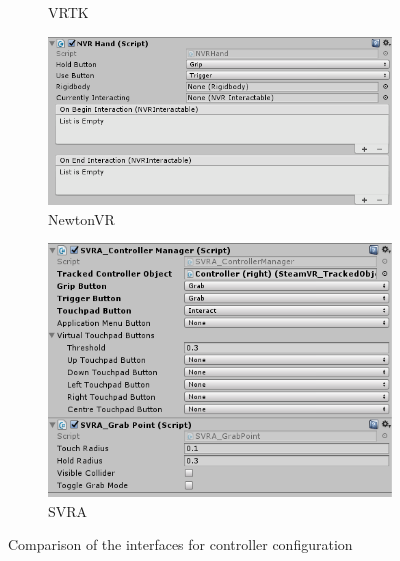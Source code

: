 \documentclass{l4proj}
\begin{document}
\begin{figure}[h]
\begin{subfigure}[h]{0.3\linewidth}
\caption{VRTK}
\end{subfigure}
\hfill
\begin{subfigure}[h]{0.3\linewidth}
\includegraphics[width=\linewidth]{dissertation/newton_controller.png}
\caption{NewtonVR}
\end{subfigure}
\hfill
\begin{subfigure}[h]{0.3\linewidth}
\includegraphics[width=\linewidth]{dissertation/svra_controller.png}
\caption{SVRA}
\end{subfigure}
\caption{Comparison of the interfaces for controller configuration}
\end{figure}
\end{document}
